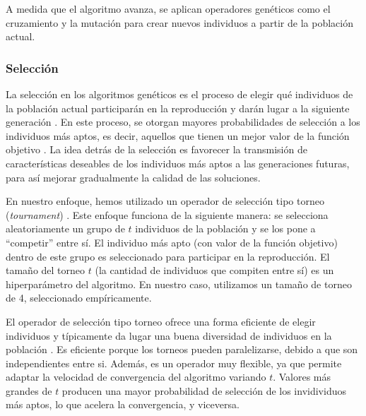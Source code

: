 A medida que el algoritmo avanza, se aplican operadores genéticos como el cruzamiento y la mutación para crear nuevos individuos a partir de la población actual.

\subsubsection{Selección}

La selección en los algoritmos genéticos es el proceso de elegir qué individuos de la población actual participarán en la reproducción y darán lugar a la siguiente generación \cite{Goldberg:1989}. En este proceso, se otorgan mayores probabilidades de selección a los individuos más aptos, es decir, aquellos que tienen un mejor valor de la función objetivo \cite{Goldberg:1989} .  La idea detrás de la selección es favorecer la transmisión de características deseables de los individuos más aptos a las generaciones futuras, para así mejorar gradualmente la calidad de las soluciones.

En nuestro enfoque, hemos utilizado un operador de selección tipo torneo (\emph{tournament}) \cite{Goldberg:1989}. Este enfoque funciona de la siguiente manera: se selecciona aleatoriamente un grupo de $t$ individuos de la población y se los pone a ``competir'' entre sí. El individuo más apto (con valor de la función objetivo) dentro de este grupo es seleccionado para participar en la reproducción. El tamaño del torneo $t$ (la cantidad de individuos que compiten entre sí) es un hiperparámetro del algoritmo. En nuestro caso, utilizamos un tamaño de torneo de 4, seleccionado empíricamente.

El operador de selección tipo torneo ofrece una forma eficiente de elegir individuos y típicamente da lugar una buena diversidad de individuos en la población \cite{Goldberg:1989}. Es eficiente porque los torneos pueden paralelizarse, debido a que son independientes entre si. Además, es un operador muy flexible, ya que permite adaptar la velocidad de convergencia del algoritmo variando $t$. Valores más grandes de $t$ producen una mayor probabilidad de selección de los invidividuos más aptos, lo que acelera la convergencia, y viceversa. 

